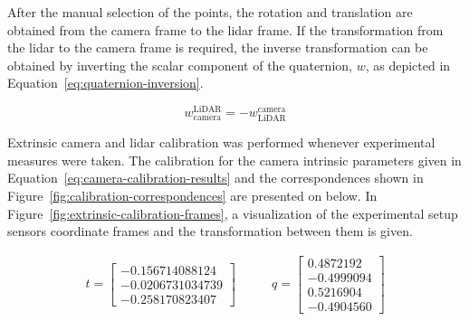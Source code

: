 After the manual selection of the points, the rotation and translation are obtained from the camera frame to the \ac{lidar} frame. If the transformation from the \ac{lidar} to the camera frame is required, the inverse transformation can be obtained by inverting the scalar component of the quaternion, $w$, as depicted in Equation~\eqref{eq:quaternion-inversion}. 

\begin{equation}
	\label{eq:quaternion-inversion}
	w^\text{LiDAR}_\text{camera} = - w^\text{camera}_\text{LiDAR}
\end{equation}

Extrinsic camera and \ac{lidar} calibration was performed whenever experimental measures were taken. The calibration for the camera intrinsic parameters given in Equation~\eqref{eq:camera-calibration-results} and the correspondences shown in Figure~\ref{fig:calibration-correspondences} are presented on below. In Figure~\ref{fig:extrinsic-calibration-frames}, a visualization of the experimental setup sensors coordinate frames and the transformation between them is given.

\begin{subequations}
	\label{eq:camera-to-lidar-transform}
	\begin{align}
		t = \begin{bmatrix}
			-0.156714088124  \\
			-0.0206731034739 \\
			-0.258170823407
		\end{bmatrix} \nonumber
		& \qquad
		q = \begin{bmatrix} 
		 0.4872192 \\
		-0.4999094 \\
		 0.5216904 \\
		-0.4904560
	\end{bmatrix} \nonumber
	\end{align}
\end{subequations}

